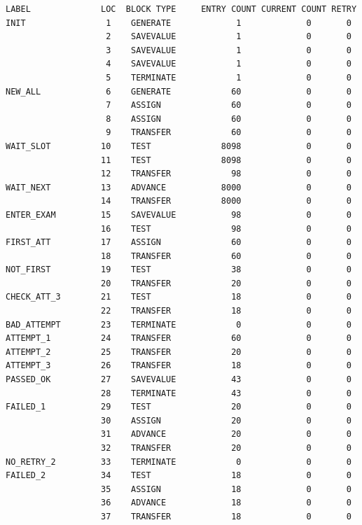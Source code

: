 \documentclass[a4paper, 14pt]{extarticle}
\begin{document}
\begin{longlisting}
\begin{verbatim}
LABEL              LOC  BLOCK TYPE     ENTRY COUNT CURRENT COUNT RETRY
INIT                1    GENERATE             1             0       0
                    2    SAVEVALUE            1             0       0
                    3    SAVEVALUE            1             0       0
                    4    SAVEVALUE            1             0       0
                    5    TERMINATE            1             0       0
NEW_ALL             6    GENERATE            60             0       0
                    7    ASSIGN              60             0       0
                    8    ASSIGN              60             0       0
                    9    TRANSFER            60             0       0
WAIT_SLOT          10    TEST              8098             0       0
                   11    TEST              8098             0       0
                   12    TRANSFER            98             0       0
WAIT_NEXT          13    ADVANCE           8000             0       0
                   14    TRANSFER          8000             0       0
ENTER_EXAM         15    SAVEVALUE           98             0       0
                   16    TEST                98             0       0
FIRST_ATT          17    ASSIGN              60             0       0
                   18    TRANSFER            60             0       0
NOT_FIRST          19    TEST                38             0       0
                   20    TRANSFER            20             0       0
CHECK_ATT_3        21    TEST                18             0       0
                   22    TRANSFER            18             0       0
BAD_ATTEMPT        23    TERMINATE            0             0       0
ATTEMPT_1          24    TRANSFER            60             0       0
ATTEMPT_2          25    TRANSFER            20             0       0
ATTEMPT_3          26    TRANSFER            18             0       0
PASSED_OK          27    SAVEVALUE           43             0       0
                   28    TERMINATE           43             0       0
FAILED_1           29    TEST                20             0       0
                   30    ASSIGN              20             0       0
                   31    ADVANCE             20             0       0
                   32    TRANSFER            20             0       0
NO_RETRY_2         33    TERMINATE            0             0       0
FAILED_2           34    TEST                18             0       0
                   35    ASSIGN              18             0       0
                   36    ADVANCE             18             0       0
                   37    TRANSFER            18             0       0

\end{verbatim}
\end{longlisting}
\end{document}
